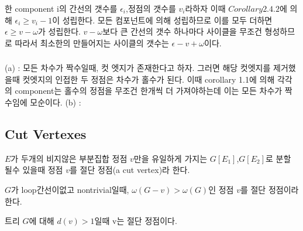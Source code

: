 \subsubsection{}
한 component i의 간선의 갯수를 $\epsilon_{i}$,정점의 갯수를 $v_i$라하자 이때 $Corollary 2.4.2$에 의해
$\epsilon_{i} \ge  v_i - 1$이 성립한다. 모든 컴포넌트에 의해 성립하므로 이를 모두 더하면
$\epsilon \ge v - \omega$가 성립한다. $v - \omega$보다 큰 간선의 갯수 하나마다 사이클을 무조건 형성하므로 따라서 최소한의 만들어지는 사이클의 갯수는 $\epsilon - v + \omega$이다.


\subsubsection{}
(a) : 모든 차수가 짝수일때, 컷 엣지가 존재한다고 하자. 그러면 해당 컷엣지를 제거했을때 컷엣지의 인접한 두 정점은 차수가 홀수가 된다. 이때 corollary 1.1에 의해 각각의 component는 홀수의 정점을 무조건 한개씩 더 가져야하는데 이는 모든 차수가 짝수임에 모순이다.
(b) : 
\subsubsection{}
\subsubsection{}
\subsubsection{}








\subsection{Cut Vertexes}

\begin{dfn}
    $E$가 두개의 비지않은 부분집합 정점 $v$만을 유일하게 가지는 $G[E_1]$,$G[E_2]$로 분할 될수 있을때 정점 $v$를 절단 정점(a cut vertex)라 한다.
    
    $G$가 loop간선이없고 nontrivial일때, $\omega(G-v) > \omega(G)$인 정점 $v$를 절단 정점이라 한다.
\end{dfn}

\begin{theorem}
    트리 $G$에 대해 $d(v) > 1$일때 v는 절단 정점이다.   
\end{theorem}

